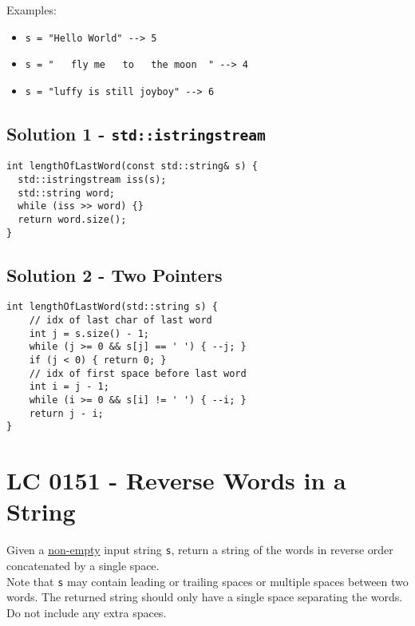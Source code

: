 Examples:
\begin{itemize}
	\item {\colorbox{CodeBackground}{\lstinline|s = "Hello World" --> 5|}}
	\item {\colorbox{CodeBackground}{\lstinline|s = "   fly me   to   the moon  " --> 4|}}
	\item {\colorbox{CodeBackground}{\lstinline|s = "luffy is still joyboy" --> 6|}}
\end{itemize}

\subsection*{Solution 1 - {\colorbox{CodeBackground}{\lstinline|std::istringstream|}}}
\begin{lstlisting}
int lengthOfLastWord(const std::string& s) {
  std::istringstream iss(s);
  std::string word;
  while (iss >> word) {}
  return word.size();
}
\end{lstlisting}

\subsection*{Solution 2 - Two Pointers}
\begin{lstlisting}
int lengthOfLastWord(std::string s) {
	// idx of last char of last word
	int j = s.size() - 1;
	while (j >= 0 && s[j] == ' ') { --j; }
	if (j < 0) { return 0; }
	// idx of first space before last word
	int i = j - 1;
	while (i >= 0 && s[i] != ' ') { --i; }
	return j - i;
}
\end{lstlisting}

\section{LC 0151 - Reverse Words in a String}\label{lc0151}
Given a \ul{non-empty} input string {\colorbox{CodeBackground}{\lstinline|s|}}, return a string of the words in reverse order concatenated by a single space. \\

Note that {\colorbox{CodeBackground}{\lstinline|s|}} may contain leading or trailing spaces or multiple spaces between two words. The returned string should only have a single space separating the words. Do not include any extra spaces.\\


